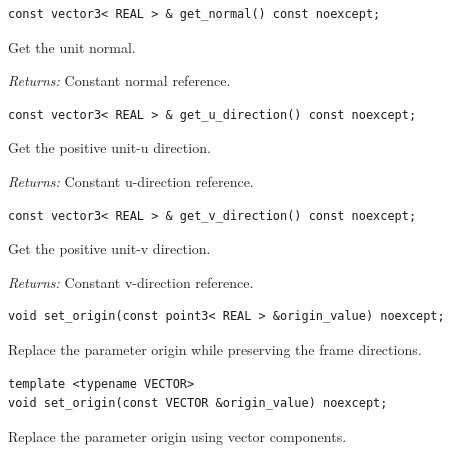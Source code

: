 \par\noindent\begin{minipage}{\linewidth}
\begin{lstlisting}[style=apireference]
const vector3< REAL > & get_normal() const noexcept;
\end{lstlisting}
{\footnotesize Get the unit normal.\par}
{\footnotesize\textit{Returns:} Constant normal reference.\par}
\end{minipage}\par\vspace{1pt}
\par\noindent\begin{minipage}{\linewidth}
\begin{lstlisting}[style=apireference]
const vector3< REAL > & get_u_direction() const noexcept;
\end{lstlisting}
{\footnotesize Get the positive unit-u direction.\par}
{\footnotesize\textit{Returns:} Constant u-direction reference.\par}
\end{minipage}\par\vspace{1pt}
\par\noindent\begin{minipage}{\linewidth}
\begin{lstlisting}[style=apireference]
const vector3< REAL > & get_v_direction() const noexcept;
\end{lstlisting}
{\footnotesize Get the positive unit-v direction.\par}
{\footnotesize\textit{Returns:} Constant v-direction reference.\par}
\end{minipage}\par\vspace{1pt}
\par\noindent\begin{minipage}{\linewidth}
\begin{lstlisting}[style=apireference]
void set_origin(const point3< REAL > &origin_value) noexcept;
\end{lstlisting}
{\footnotesize Replace the parameter origin while preserving the frame directions.\par}
\end{minipage}\par\vspace{1pt}
\par\noindent\begin{minipage}{\linewidth}
\begin{lstlisting}[style=apireference]
template <typename VECTOR>
void set_origin(const VECTOR &origin_value) noexcept;
\end{lstlisting}
{\footnotesize Replace the parameter origin using vector components.\par}
\end{minipage}\par\vspace{1pt}
